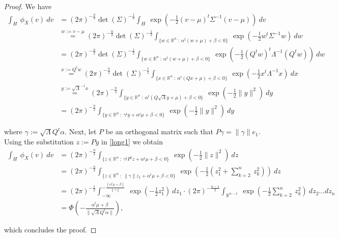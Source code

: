 \documentclass[10pt,a4paper]{amsart}
\newcommand{\reals}{\mathbb{R}}
\begin{document}
\begin{proof}
We have 
\begin{equation}
\begin{split}
\int_H\ \phi_X(v)\ dv &= (2\pi)^{-\frac{n}{2}} \det(\Sigma)^{-\frac{1}{2}} \int_H\ \exp\left( - \frac{1}{2} (v-\mu)^t \Sigma^{-1} (v-\mu)\right)\ dv \\
&\stackrel{w := v-\mu}{=} (2\pi)^{-\frac{n}{2}} \det(\Sigma)^{-\frac{1}{2}} \int_{\{w\in\reals^n\ :\ \alpha^t(w + \mu) + \beta < 0\}}\ \exp\left( - \frac{1}{2} w^t \Sigma^{-1}w\right)\ dw\\
&= (2\pi)^{-\frac{n}{2}} \det(\Sigma)^{-\frac{1}{2}} \int_{\{w\in\reals^n\ :\ \alpha^t(w + \mu) + \beta < 0\}}\ \exp\left( - \frac{1}{2} (Q^tw)^t \Lambda^{-1} (Q^tw)\right)\ dw \\
&\stackrel{x := Q^tw}{=} (2\pi)^{-\frac{n}{2}} \det(\Sigma)^{-\frac{1}{2}} \int_{\{x\in\reals^n\ :\ \alpha^t(Qx + \mu) + \beta < 0\}}\ \exp\left( - \frac{1}{2} x^t \Lambda^{-1} x\right)\ dx \\
&\stackrel{y := \sqrt{\Lambda}^{-1}x}{=} (2\pi)^{-\frac{n}{2}} \int_{\{y\in\reals^n\ :\ \alpha^t(Q\sqrt{\Lambda}y + \mu) + \beta < 0\}}\ \exp\left( - \frac{1}{2} \|y\|^2\right)\ dy \\
&= (2\pi)^{-\frac{n}{2}} \int_{\{y\in\reals^n\ :\ \gamma^t y + \alpha^t\mu + \beta < 0\}}\ \exp\left( - \frac{1}{2} \|y\|^2\right)\ dy
\end{split}
\label{long1}
\end{equation}

\noindent
where $\gamma := \sqrt{\Lambda} Q^t\alpha$. Next, let $P$ be an orthogonal matrix such that $P\gamma = \|\gamma\| e_1.$ Using the substitution $z := Py$ in \eqref{long1} we obtain
\begin{equation*}
\begin{split}
\int_H\ \phi_X(v)\ dv &= (2\pi)^{-\frac{n}{2}} \int_{\{z\in\reals^n\ :\ \gamma^t P^t z + \alpha^t\mu + \beta < 0\}}\ \exp\left( - \frac{1}{2} \|z\|^2\right)\ dz\\
&= (2\pi)^{-\frac{n}{2}} \int_{\{z\in\reals^n\ :\ \|\gamma\| z_1 + \alpha^t\mu + \beta < 0\}}\ \exp\left( - \frac{1}{2} \left(z_1^2 + \sum_{k=2}^n\ z_k^2\right)\right)\ dz\\
&= (2\pi)^{-\frac{1}{2}} \int_{-\infty}^{-\frac{(\alpha^t\mu + \beta)}{\|\gamma\|}}\ \exp\left(-\frac{1}{2}z_1^2\right)\ dz_1 \cdot (2\pi)^{-\frac{n-1}{2}} \int_{\reals^{n-1}}\ \exp\left(-\frac{1}{2}\sum_{k=2}^n\ z_k^2\right)\ dz_2\ldots dz_n\\
&= \Phi\left(-\frac{\alpha^t\mu + \beta}{\|\sqrt{\Lambda}Q^t\alpha\|}\right),
\end{split}
\end{equation*}

\noindent
which concludes the proof.
\end{proof}
\end{document}
